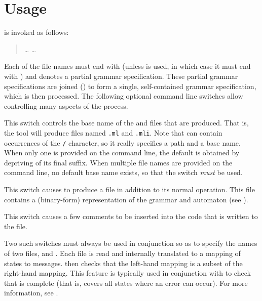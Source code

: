 \documentclass[onecolumn,11pt,nocopyrightspace,preprint]{sigplanconf}
\begin{document}

\section{Usage}

\menhir is invoked as follows:
\begin{quote}
\cmenhir {} \ldots {}  \ldots {}
\end{quote}
Each of the file names must end with \mly (unless \orocq is used,
in which case it must end with \vy) and denotes a partial
grammar specification. These partial grammar specifications are joined
() to form a single, self-contained grammar specification,
which is then processed. The following optional command line switches allow
controlling many aspects of the process.

 This switch controls the base name
of the \ml and \mli files that are produced. That is, the tool will produce
files named \texttt{.ml} and \texttt{.mli}. Note
that  can contain occurrences of the \texttt{/} character, so it
really specifies a path and a base name. When only one  is
provided on the command line, the default  is obtained by
depriving  of its final \mly suffix. When multiple file
names are provided on the command line, no default base name exists, so that
the \obase switch \emph{must} be used.

\docswitch{\ocmly} This switch causes \menhir to produce a \cmly file in
addition to its normal operation. This file contains a (binary-form)
representation of the grammar and automaton (see ).

\docswitch{\ocomment} This switch causes a few comments to be inserted into the
\ocaml code that is written to the \ml file.

 Two
such switches must always be used in conjunction so as to specify the names of
two \messages files,  and . Each file is read and
internally translated to a mapping of states to messages. \menhir then checks
that the left-hand mapping is a subset of the right-hand mapping. This feature
is typically used in conjunction with \olisterrors to check that 
is complete (that is, covers all states where an error can occur).
For more information, see .
\end{document}
